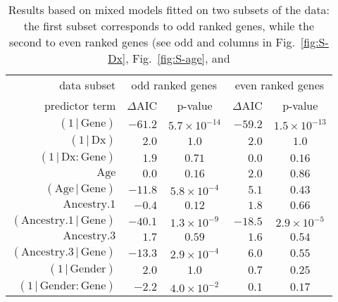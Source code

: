 \documentclass[letterpaper]{article}
\begin{document}
\begin{table}[H]
\begin{center}
\begin{tabular}{r|rc|rc}
data subset                                & \multicolumn{2}{c}{odd ranked genes} & \multicolumn{2}{c}{even ranked genes}\\
predictor term                             &\(\Delta\)AIC&       p-value          &\(\Delta\)AIC&       p-value          \\
\hline
\((1\,|\,\mathrm{Gene})\)                  & \(-61.2\)   & \(5.7\times 10^{-14}\) & \(-59.2\)   & \(1.5\times 10^{-13}\) \\
\((1\,|\,\mathrm{Dx})\)                    & \(2.0\)     & \(1.0\)                & \(2.0\)     & \(1.0\)                \\
\((1\,|\,\mathrm{Dx}:\mathrm{Gene})\)      & \(1.9\)     & \(0.71\)               & \(0.0\)     &  \(0.16\)              \\
\(\mathrm{Age}\)                           & \(0.0\)     & \(0.16\)               & \(2.0\)     & \(0.86\)               \\
\((\mathrm{Age}\,|\,\mathrm{Gene})\)       & \(-11.8\)   & \(5.8\times 10^{-4}\)  & \(5.1\)     & \(0.43\)               \\
\(\mathrm{Ancestry.1}\)                    & \(-0.4\)    & \(0.12\)               & \(1.8\)     & \(0.66\)               \\
\((\mathrm{Ancestry.1}\,|\,\mathrm{Gene})\)& \(-40.1\)   & \(1.3\times 10^{-9}\)  & \(-18.5\)   & \(2.9\times 10^{-5}\)  \\
\(\mathrm{Ancestry.3}\)                    & \(1.7\)     & \(0.59\)               & \(1.6\)     & \(0.54\)               \\
\((\mathrm{Ancestry.3}\,|\,\mathrm{Gene})\)& \(-13.3\)   & \(2.9\times 10^{-4}\)  & \(6.0\)     & \(0.55\)               \\
\((1\,|\,\mathrm{Gender})\)                & \(2.0\)     & \(1.0\)                & \(0.7\)     & \(0.25\)               \\
\((1\,|\,\mathrm{Gender}:\mathrm{Gene})\)  & \(-2.2\)    & \(4.0\times 10^{-2}\)  & \(0.1\)     & \(0.17\)               \\
\end{tabular}
\end{center}
\caption{Results based on mixed models fitted on two subsets of the data: the
first subset corresponds to odd ranked genes, while the second to even ranked
genes (see odd and columns in Fig.~\ref{fig:S-Dx}, Fig.~\ref{fig:S-age}, and
}
\end{table}
\end{document}
